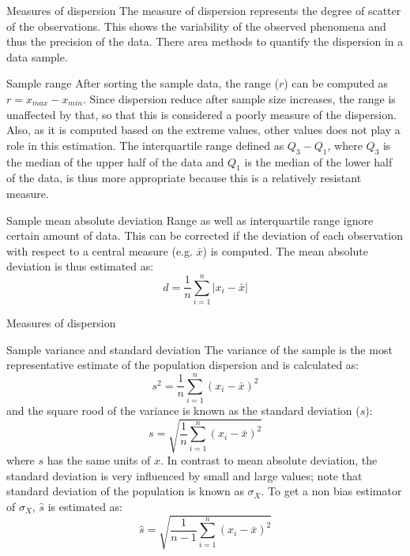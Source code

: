 \documentclass[8pt]{beamer}
\renewcommand{\emph}[1]{\textcolor{myorange}{#1}}
\begin{document}
\begin{frame}{Measures of dispersion}
    The \emph{measure of dispersion} represents the degree of scatter of the observations. This shows the variability of the observed phenomena and thus the precision of the data. There area methods to quantify the dispersion in a data sample.

    \begin{block}{Sample range}
        After sorting the sample data, the \emph{range} ($r$) can be computed as $r = x_{max} - x_{min}$. Since dispersion reduce after sample size increases, the range is unaffected by that, so that this is considered  a poorly measure of the dispersion. Also, as it is computed based on the extreme values, other values does not play a role in this estimation. The  \emph{interquartile range} defined as $Q_3 - Q_1$,  where $Q_3$ is the median of the upper half of the data and $Q_1$ is the median of the lower half of the data, is thus more appropriate because this is a relatively resistant measure.
    \end{block}

    \begin{block}{Sample mean absolute deviation}
        Range as well as interquartile range ignore certain amount of data. This can be corrected if the deviation of each observation with respect to a central measure (e.g. $\bar{x}$) is computed. The \emph{mean absolute deviation} is thus estimated as:
        $$
        d = \frac{1}{n}\sum_{i=1}^n | x_i - \bar{x} |
        $$
    \end{block}
\end{frame}

\begin{frame}{Measures of dispersion}

    \begin{block}{Sample variance and standard deviation}
        The \emph{variance} of the sample is the most representative estimate of the population dispersion and is calculated as:
        $$
        s^2 = \frac{1}{n} \sum_{i=1}^n \left( x_i - \bar{x} \right)^2
        $$
        and the square rood of the variance is known as the \emph{standard deviation} ($s$):
        $$
        s = \sqrt{\frac{1}{n} \sum_{i=1}^n \left( x_i - \bar{x} \right)^2}
        $$
        where $s$ has the same units of $x$. In contrast to \emph{mean absolute deviation}, the standard deviation is very influenced by small and large values; note that standard deviation of the population is known as $\sigma_X$. To get a non bias estimator of $\sigma_X$, $\hat{s}$ is estimated as:
        $$
        \hat{s} = \sqrt{\frac{1}{n-1} \sum_{i=1}^n \left( x_i - \bar{x} \right)^2}
        $$
        
    \end{block}
\end{frame}
\end{document}
